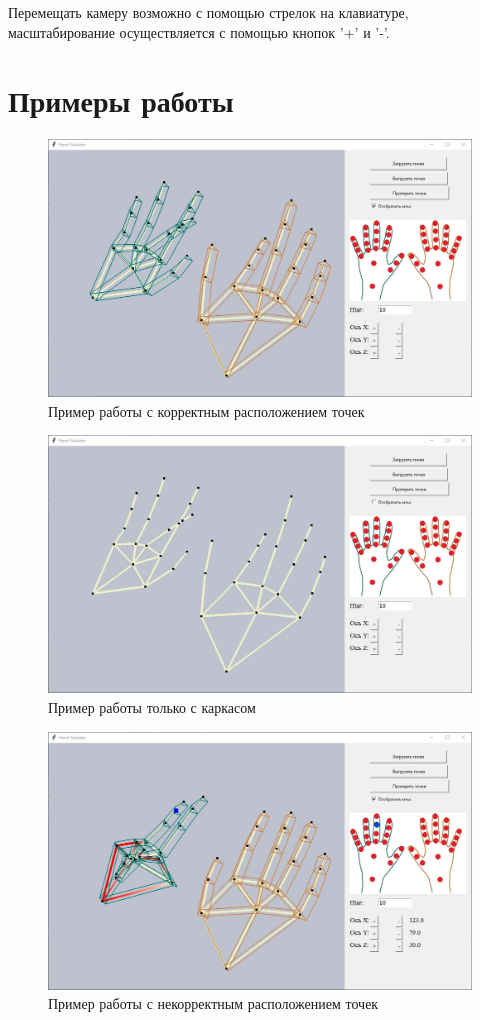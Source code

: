 \hspace{0.6cm} Перемещать камеру возможно с помощью стрелок на клавиатуре, масштабирование осуществляется с помощью кнопок '+' и '-'.

\section{Примеры работы}

\begin{figure}[ht!]
	\centering
	\includegraphics[scale=0.5]{example1.jpg}
	\caption{Пример работы с корректным расположением точек}
	\label{fig:example1}
\end{figure}

\begin{figure}[ht!]
	\centering
	\includegraphics[scale=0.5]{example2.jpg}
	\caption{Пример работы только с каркасом}
	\label{fig:example2}
\end{figure}

\begin{figure}[ht!]
	\centering
	\includegraphics[scale=0.5]{example3.jpg}
	\caption{Пример работы с некорректным расположением точек}
	\label{fig:example3}
\end{figure}



